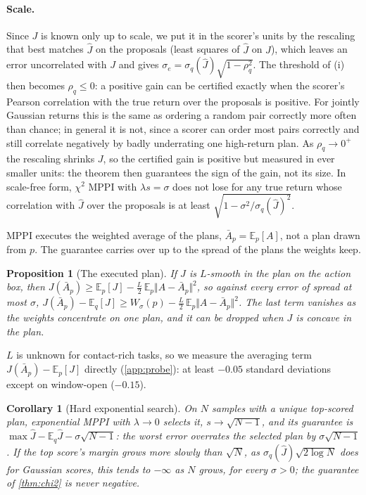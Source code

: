 \documentclass{article}
\theoremstyle{plain}
\newtheorem{proposition}[theorem]{Proposition}
\newtheorem{corollary}[theorem]{Corollary}
\theoremstyle{remark}
\newcommand{\E}{\mathbb{E}}
\newcommand{\Jh}{\hat{J}}
\begin{document}
\paragraph{Scale.} Since $J$ is known only up to scale, we put it in the scorer's units by the rescaling that best
matches $\Jh$ on the proposals (least squares of $\Jh$ on $J$), which leaves an error uncorrelated with $J$ and gives
$\sigma_e=\sigma_q(\Jh)\sqrt{1-\rho_q^2}$. The threshold of (i) then becomes $\rho_q\le0$: a
positive gain can be certified exactly when the scorer's Pearson correlation with the true return over the proposals is
positive. For jointly Gaussian returns this is the same as ordering a random pair correctly more often than chance; in
general it is not, since a scorer can order most pairs correctly and still correlate negatively by badly underrating
one high-return plan. As $\rho_q\to0^+$ the rescaling shrinks $J$, so the certified gain is positive but measured in ever smaller units: the
theorem then guarantees the sign of the gain, not its size. In scale-free form, $\chi^2$ MPPI with $\lambda s=\sigma$
does not lose for any true return whose correlation with $\Jh$ over the proposals is at least
$\sqrt{1-\sigma^2/\sigma_q(\Jh)^2}$.

MPPI executes the weighted average of the plans, $\bar A_p=\E_p[A]$, not a plan drawn from $p$. The guarantee carries
over up to the spread of the plans the weights keep.

\begin{proposition}[The executed plan]\label{prop:exec}
If $J$ is $L$-smooth in the plan on the action box, then $J(\bar A_p)\ge\E_p[J]-\tfrac L2\,\E_p\Vert A-\bar A_p\Vert^2$, so
against every error of spread at most $\sigma$, $J(\bar A_p)-\E_q[J]\ge W_\sigma(p)-\tfrac L2\,\E_p\Vert A-\bar A_p\Vert^2$.
The last term vanishes as the weights concentrate on one plan, and it can be dropped when $J$ is concave in the plan.
\end{proposition}

$L$ is unknown for contact-rich tasks, so we measure the averaging term $J(\bar A_p)-\E_p[J]$ directly
(\cref{app:probe}): at least $-0.05$ standard deviations except on window-open ($-0.15$).

\begin{corollary}[Hard exponential search]\label{prop:exp}
On $N$ samples with a unique top-scored plan, exponential MPPI with $\lambda\to0$ selects it, $s\to\sqrt{N-1}$, and its
guarantee is $\max\Jh-\E_q\Jh-\sigma\sqrt{N-1}$: the worst error overrates the selected plan by $\sigma\sqrt{N-1}$. If
the top score's margin grows more slowly than $\sqrt N$, as $\sigma_q(\Jh)\sqrt{2\log N}$ does for Gaussian scores,
this tends to $-\infty$ as $N$ grows, for every $\sigma>0$; the guarantee of \cref{thm:chi2} is never negative.
\end{corollary}
\end{document}
